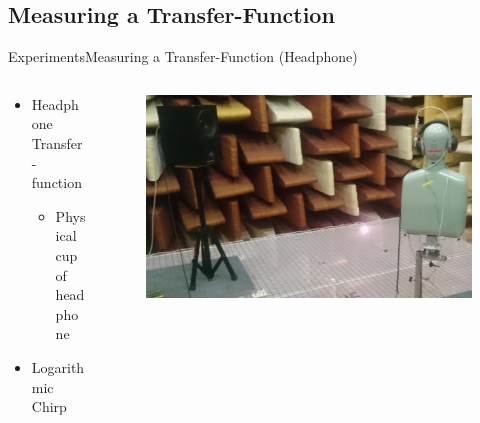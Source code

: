 \subsection{Measuring a Transfer-Function}
\begin{frame}{Experiments}{Measuring a Transfer-Function (Headphone)}		
	\begin{columns}
		\begin{column}{0.5\textwidth}
			\begin{itemize}
				\item Headphone Transfer-function
				\begin{itemize}
					\item Physical cup of headphone
				\end{itemize}
				\item{Logarithmic Chirp}
			\end{itemize}
		\end{column}
		\begin{column}{0.5\textwidth} 
			\begin{figure}[h]
				\includegraphics[width=1\textwidth]{figures/TransferFunctionHP}
			\end{figure}
		\end{column}
	\end{columns}
\end{frame}

